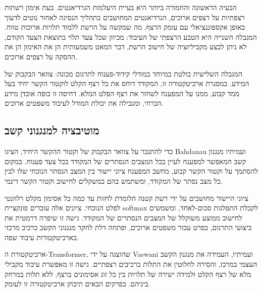 הבעיה הראשונה והחמורה ביותר היא בעיית היעלמות הגרדיאנטים. בעת אימון
רשתות רצפתיות על רצפים ארוכים, הגרדיאנטים המחושבים בתהליך הנסיגה לאחור
נוטים לדעוך באופן אקספוננציאלי עם עומק הרצף, מה שמקשה על הרשת ללמוד
תלויות ארוכות טווח. המגבלה השנייה היא הטבע הרצפתי של העיבוד: מכיוון שכל
צעד תלוי בתוצאת הצעד הקודם, לא ניתן לבצע מקביליזציה של חישוב הרשת, דבר
המאט משמעותית הן את האימון הן את ההסקה על רצפים ארוכים.

המגבלה השלישית בולטת במיוחד במודלי קידוד-פענוח לתרגום מכונה: צוואר
הבקבוק של המידע. במסגרת ארכיטקטורה זו, המקודד דוחס את כל רצף הקלט לוקטור
הקשר יחיד בעל ממד קבוע, ממנו על המפענח לשחזר את רצף הפלט המלא. דחיסה זו
כופה אובדן מידע הכרחי, ומגבילה את יכולת המודל לעיבוד משפטים ארוכים.

\hypertarget{ux5deux5d5ux5d8ux5d9ux5d1ux5e6ux5d9ux5d4-ux5dcux5deux5e0ux5d2ux5e0ux5d5ux5e0ux5d9-ux5e7ux5e9ux5d1}{%
\subsection{מוטיבציה למנגנוני
קשב}\label{ux5deux5d5ux5d8ux5d9ux5d1ux5e6ux5d9ux5d4-ux5dcux5deux5e0ux5d2ux5e0ux5d5ux5e0ux5d9-ux5e7ux5e9ux5d1}}

כדי להתגבר על צוואר הבקבוק של וקטור ההקשר היחיד, הציגו Bahdanau ועמיתיו
מנגנון קשב המאפשר למפענח לעיין בכל המצבים הנסתרים של המקודד בכל צעד
פענוח. במקום להסתמך על וקטור הקשר קבוע, מחשב המפענח ציוני יישור בין המצב
הנסתר הנוכחי שלו לבין כל מצב נסתר של המקודד, ומשתמש בהם כמשקלים לחישוב
וקטור הקשר דינמי.

ציוני היישור מחושבים על ידי רשת קטנה הלומדת לחזות עד כמה כל אסימון מקלט
רלוונטי לפלט הנוכחי. ציונים אלה עוברים פונקציית softmax לקבלת התפלגות
סכום-לאחד, ומשמשים לחישוב ממוצע משוקלל של המצבים הנסתרים של המקודד. גישה
זו שיפרה דרמטית את ביצועי התרגום, בפרט עבור משפטים ארוכים, ופתחה דלת
לחקר מנגנוני הקשב כרכיב מרכזי בארכיטקטורות עיבוד שפה.

ארכיטקטורת ה-Transformer, שהוצגה על ידי Vaswani ועמיתיו, העמידה את
מנגנון הקשב העצמי במרכז, והסירה לחלוטין את התלות ברכיבים רצפתיים. גישה
זו מאפשרת עיבוד מקבילי מלא של רצף הקלט ולמידה ישירה של תלויות בין כל זוג
אסימונים ברצף, ללא תלות במרחק ביניהם. בפרקים הבאים תיבחן ארכיטקטורה זו
לעומק.

